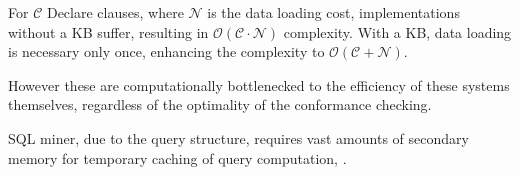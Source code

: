 For $\mathcal{C}$ Declare clauses, where $\mathcal{N}$ is the data loading cost, implementations without a KB suffer, resulting in $\mathcal{O(C \cdot N)}$ complexity. With a KB, data loading is necessary only once, enhancing the complexity to $\mathcal{O(C + N)}$.

However these are computationally bottlenecked to the efficiency of these systems themselves, regardless of the optimality of the conformance checking.

SQL miner, due to the query structure, requires vast amounts of secondary memory for temporary caching of query computation, .